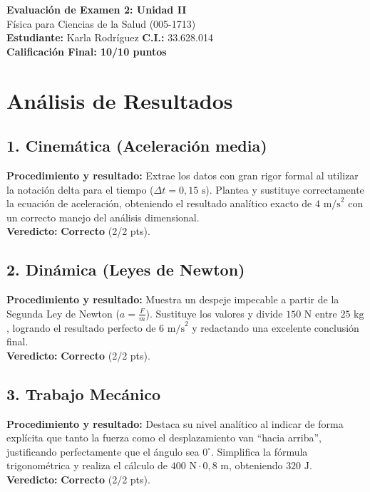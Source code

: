 \documentclass[12pt,letterpaper]{article}
\begin{document}
\begin{center}
    \Large \textbf{Evaluación de Examen 2: Unidad II} \\
    \large Física para Ciencias de la Salud (005-1713) \\
    \vspace{0.5cm}
    \textbf{Estudiante:} Karla Rodríguez \quad \textbf{C.I.:} 33.628.014
    \vspace{0.3cm} \\
    \large \textbf{Calificación Final: 10/10 puntos}
\end{center}

\vspace{0.5cm}

\section*{Análisis de Resultados}

\subsection*{1. Cinemática (Aceleración media)}
\textbf{Procedimiento y resultado:} Extrae los datos con gran rigor formal al utilizar la notación delta para el tiempo ($\Delta t = 0,15 \text{ s}$). Plantea y sustituye correctamente la ecuación de aceleración, obteniendo el resultado analítico exacto de $4 \text{ m/s}^2$ con un correcto manejo del análisis dimensional. \\
\textbf{Veredicto:} \textbf{Correcto} (2/2 pts).

\subsection*{2. Dinámica (Leyes de Newton)}
\textbf{Procedimiento y resultado:} Muestra un despeje impecable a partir de la Segunda Ley de Newton ($a = \frac{F}{m}$). Sustituye los valores y divide $150 \text{ N}$ entre $25 \text{ kg}$, logrando el resultado perfecto de $6 \text{ m/s}^2$ y redactando una excelente conclusión final. \\
\textbf{Veredicto:} \textbf{Correcto} (2/2 pts).

\subsection*{3. Trabajo Mecánico}
\textbf{Procedimiento y resultado:} Destaca su nivel analítico al indicar de forma explícita que tanto la fuerza como el desplazamiento van ``hacia arriba'', justificando perfectamente que el ángulo sea $0^\circ$. Simplifica la fórmula trigonométrica y realiza el cálculo de $400 \text{ N} \cdot 0,8 \text{ m}$, obteniendo $320 \text{ J}$. \\
\textbf{Veredicto:} \textbf{Correcto} (2/2 pts).
\end{document}

